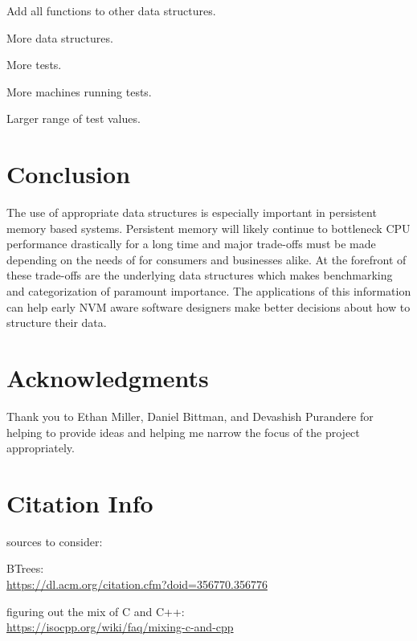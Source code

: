 \documentclass[twocolumn]{article}
\begin{document}
Add all functions to other data structures.

More data structures.

More tests.

More machines running tests.

Larger range of test values.

\section{Conclusion}

The use of appropriate data structures is especially important in persistent
memory based systems. Persistent memory will likely continue to bottleneck CPU
performance drastically for a long time and major trade-offs must be made
depending on the needs of for consumers and businesses alike. At the forefront
of these trade-offs are the underlying data structures which makes benchmarking
and categorization of paramount importance. The applications of this information
can help early NVM aware software designers make better decisions about how to
structure their data.

\section{Acknowledgments}

Thank you to Ethan Miller, Daniel Bittman, and Devashish Purandere for helping
to provide ideas and helping me narrow the focus of the project appropriately.

\section{Citation Info}


sources to consider:

BTrees:\\
\url{https://dl.acm.org/citation.cfm?doid=356770.356776}

figuring out the mix of C and C++:\\
\url{https://isocpp.org/wiki/faq/mixing-c-and-cpp}
\end{document}
